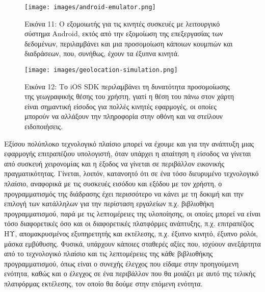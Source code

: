 \documentclass[
]{article}
\begin{document}
\leavevmode{}%
\begin{figure}
\hypertarget{fig:android-emulator}{%
\centering
\texttt{[image: images/android-emulator.png]}
\caption{Εικόνα 11: Ο εξομοιωτής για τις κινητές συσκευές με λειτουργικό
σύστημα Android, εκτός από την εξομοίωση της επεξεργασίας των δεδομένων,
περιλαμβάνει και μια προσομοίωση κάποιων κουμπιών και διαδράσεων, που,
συνήθως, έχουν τα έξυπνα κινητά.}\label{fig:android-emulator}
}
\end{figure}

\leavevmode{}%
\begin{figure}
\hypertarget{fig:geolocation-simulation}{%
\centering
\texttt{[image: images/geolocation-simulation.png]}
\caption{Εικόνα 12: Το iOS SDK περιλαμβάνει τη δυνατότητα προσομοίωσης
της γεωγραφικής θέσης του χρήστη, γιατί η θέση του πάνω στον χάρτη είναι
σημαντική είσοδος για πολλές κινητές εφαρμογές, οι οποίες μπορούν να
αλλάξουν την πληροφορία στην οθόνη και να στείλουν
ειδοποιήσεις.}\label{fig:geolocation-simulation}
}
\end{figure}

Εξίσου πολύπλοκο τεχνολογικό πλαίσιο μπορεί να έχουμε και για την
ανάπτυξη μιας εφαρμογής επιτραπέζιου υπολογιστή, όταν υπάρχει η απαίτηση
η είσοδος να γίνεται από συσκευή χειρονομίας και η έξοδος να γίνεται σε
περιβάλλον εικονικής πραγματικότητας. Γίνεται, λοιπόν, κατανοητό ότι σε
ένα τόσο διευρυμένο τεχνολογικό πλαίσιο, αναφορικά με τις συσκευές
εισόδου και εξόδου με τον χρήστη, ο προγραμματισμός της διάδρασης έχει
περισσότερο να κάνει με τη δοκιμή και την επιλογή των κατάλληλων για την
περίσταση εργαλείων π.χ. βιβλιοθήκη προγραμματισμού, παρά με τις
λεπτομέρειες της υλοποίησης, οι οποίες μπορεί να είναι τόσο διαφορετικές
όσο και οι διαφορετικές πλατφόρμες ανάπτυξης, π.χ. επιτραπέζιος ΗΥ,
απομακρυσμένος εξυπηρετητής και εκτέλεσης, π.χ. έξυπνο κινητό, έξυπνο
ρολόι, μάσκα εμβύθυσης. Φυσικά, υπάρχουν κάποιες σταθερές αξίες που,
ισχύουν ανεξάρτητα από το τεχνολογικό πλαίσιο και τις λεπτομέρειες της
κάθε βιβλιοθήκης προγραμματισμού, όπως είναι ο συνεχής έλεγχος που
είδαμε στην προηγούμενη ενότητα, καθώς και ο έλεγχος σε ένα περιβάλλον
που θα μοιάζει με αυτό της τελικής πλατφόρμας εκτέλεσης, τον οποίο θα
δούμε στην επόμενη ενότητα.
\end{document}
